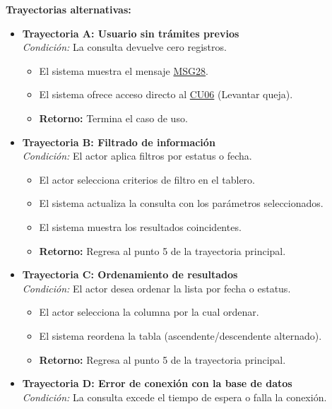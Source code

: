 \begin{appendices}
\textbf{Trayectorias alternativas:}
\begin{itemize}[leftmargin=*]
    \item \textbf{Trayectoria A: Usuario sin trámites previos} \\
    \textit{Condición:} La consulta devuelve cero registros.
    \begin{itemize}[nosep]
        \item[A-1:] El sistema muestra el mensaje \hyperlink{msg:MSG28}{MSG28}.
        \item[A-2:] El sistema ofrece acceso directo al \hyperlink{anexo:casos_uso}{CU06} (Levantar queja).
        \item \textbf{Retorno:} Termina el caso de uso.
    \end{itemize}
    \item \textbf{Trayectoria B: Filtrado de información} \\
    \textit{Condición:} El actor aplica filtros por estatus o fecha.
    \begin{itemize}[nosep]
        \item[B-1:] El actor selecciona criterios de filtro en el tablero.
        \item[B-2:] El sistema actualiza la consulta con los parámetros seleccionados.
        \item[B-3:] El sistema muestra los resultados coincidentes.
        \item \textbf{Retorno:} Regresa al punto 5 de la trayectoria principal.
    \end{itemize}
    \item \textbf{Trayectoria C: Ordenamiento de resultados} \\
    \textit{Condición:} El actor desea ordenar la lista por fecha o estatus.
    \begin{itemize}[nosep]
        \item[C-1:] El actor selecciona la columna por la cual ordenar.
        \item[C-2:] El sistema reordena la tabla (ascendente/descendente alternado).
        \item \textbf{Retorno:} Regresa al punto 5 de la trayectoria principal.
    \end{itemize}
    \item \textbf{Trayectoria D: Error de conexión con la base de datos} \\
    \textit{Condición:} La consulta excede el tiempo de espera o falla la conexión.
    \begin{itemize}[nosep]

\end{itemize}
\end{itemize}
\end{appendices}
